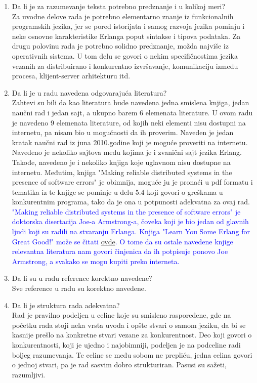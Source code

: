 \documentclass[a4paper]{report}
\newcommand{\odgovor}[1]{\textcolor{blue}{#1}}
\begin{document}
\begin{enumerate}
\item Da li je za razumevanje teksta potrebno predznanje i u kolikoj meri?\\
Za uvodne delove rada je potrebno elementarno znanje iz funkcionalnih programskih jezika, jer se pored istorijata i samog razvoja jezika pominju i neke osnovne karakteristike Erlanga poput sintakse i tipova podataka. Za drugu polovinu rada je potrebno solidno predznanje, možda najviše iz operativnih sistema. U tom delu se govori o nekim specifičnostima jezika vezanih za distribuirano i konkurentno izvršavanje, komunikaciju između procesa, klijent-server arhitekturu itd.


\item Da li je u radu navedena odgovarajuća literatura?\\
Zahtevi su bili da kao literatura bude navedena jedna smislena knjiga, jedan naučni rad i jedan sajt, a ukupno barem 6 elemenata literature. U ovom radu je navedeno 9 elemenata literature, od kojih neki elementi nisu dostupni na internetu, pa nisam bio u mogućnosti da ih proverim. Naveden je jedan kratak naučni rad iz juna 2010.godine koji je moguće proveriti na internetu. Navedeno je nekoliko sajtova među kojima je i zvanični sajt jezika Erlang. Takođe, navedeno je i nekoliko knjiga koje uglavnom nisu dostupne na internetu. Međutim, knjiga "Making reliable distributed systems in the presence of software errors" je obimnija, moguće ju je pronaći u pdf formatu i tematika iz te knjige se pominje u delu 5.4 koji govori o greškama u konkurentnim programa, tako da je ona u potpunosti adekvatna za ovaj rad.\\

\odgovor{"Making reliable distributed systems in the presence of software errors" je doktorska disertacija Joe-a Armstrong-a, čoveka koji je bio jedan od glavnih ljudi koji su radili na stvaranju Erlanga. Knjiga "Learn You Some Erlang for Great Good!" može se čitati \href{https://learnyousomeerlang.com/}{ovde}. O tome da su ostale navedene knjige relevantna literatura nam govori činjenica da ih potpisuje ponovo Joe Armstrong, a svakako se mogu kupiti preko interneta.}

\item Da li su u radu reference korektno navedene?\\
Sve reference u radu su korektno navedene. 


\item Da li je struktura rada adekvatna?\\
Rad je pravilno podeljen u celine koje su smisleno raspoređene, gde na početku rada stoji neka vrsta uvoda i opšte stvari o samom jeziku, da bi se kasnije prešlo na konkretne stvari vezane za konkurentnost. Deo koji govori o konkurentnosti, koji je ujedno i najobimniji, podeljen je na podceline radi boljeg razumevanja. Te celine se među sobom ne prepliću, jedna celina govori o jednoj stvari, pa je rad sasvim dobro strukturiran. Pasusi su sažeti, razumljivi. 



\end{enumerate}
\end{document}
